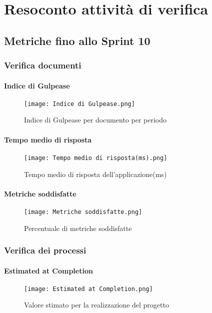 \chapter{Resoconto attività di verifica}

\section{Metriche fino allo Sprint 10}

  \subsection{Verifica documenti}
    \subsubsection{Indice di Gulpease}
    \begin{figure}[H]
      \centering
      \texttt{[image: Indice di Gulpease.png]}
      \caption{Indice di Gulpease per documento per periodo}
    \end{figure}

    \subsubsection{Tempo medio di risposta}
    \begin{figure}[H]
      \centering
      \texttt{[image: Tempo medio di risposta(ms).png]}
      \caption{Tempo medio di risposta dell'applicazione(ms)}
    \end{figure}

    \subsubsection{Metriche soddisfatte}
    \begin{figure}[H]
      \centering
      \texttt{[image: Metriche soddisfatte.png]}
      \caption{Percentuale di metriche soddisfatte}
    \end{figure}


  \subsection{Verifica dei processi}

    \subsubsection{Estimated at Completion}
    \begin{figure}[H]
      \centering
      \texttt{[image: Estimated at Completion.png]}
      \caption{Valore stimato per la realizzazione del progetto}
    \end{figure}

